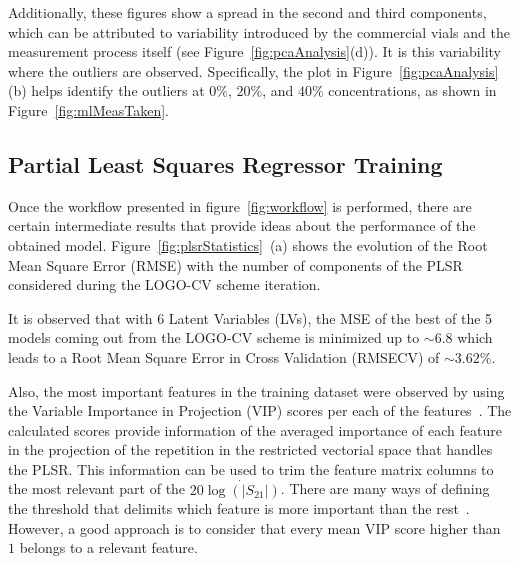 \documentclass[journal,twoside,web]{ieeecolor}
\begin{document}
Additionally, these figures show a spread in the second and third components, which can be attributed to variability introduced by the commercial vials and the measurement process itself (see Figure~\ref{fig:pcaAnalysis}(d)). It is this variability where the outliers are observed. Specifically, the plot in Figure~\ref{fig:pcaAnalysis}(b) helps identify the outliers at $0\%$, $20\%$, and $40\%$ concentrations, as shown in Figure~\ref{fig:mlMeasTaken}.   


\subsection{Partial Least Squares Regressor Training}
\label{ssec:plsRegressor}

Once the workflow presented in figure~\ref{fig:workflow} is performed, there are certain intermediate results that provide ideas about the performance of the obtained model. Figure~\ref{fig:plsrStatistics}~(a) shows the evolution of the Root Mean Square Error (RMSE) with the number of components of the PLSR considered during the LOGO-CV scheme iteration. 

It is observed that with $6$ Latent Variables (LVs), the MSE of the best of the 5 models coming out from the LOGO-CV scheme is minimized up to $\sim6.8$ which leads to a Root Mean Square Error in Cross Validation (RMSECV) of $\sim3.62\%$.

Also, the most important features in the training dataset were observed by using the Variable Importance in Projection (VIP) scores per each of the features~\cite{Chong2005}. The calculated scores provide information of the averaged importance of each feature in the projection of the repetition in the restricted vectorial space that handles the PLSR. This information can be used to trim the feature matrix columns to the most relevant part of the $20\dot{\log\left(|S_{21}|\right)}$. There are many ways of defining the threshold that delimits which feature is more important than the rest~\cite{Ansari2015}. However, a good approach is to consider that every mean VIP score higher than $1$ belongs to a relevant feature. 
 
\end{document}
